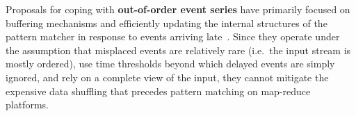 Proposals for coping with {\bf out-of-order event series} have 
primarily focused on buffering mechanisms and
 efficiently updating the internal structures of the pattern matcher in 
 response to events arriving late~\cite{Johnson:2007,Li:2007}.
Since they operate under the assumption that misplaced events are relatively 
rare (i.e.\ the input stream is mostly ordered),
use time thresholds beyond which delayed events are simply ignored,
and rely on a complete view of the input, they cannot mitigate the expensive 
data shuffling that precedes pattern matching on map-reduce platforms.   
 




